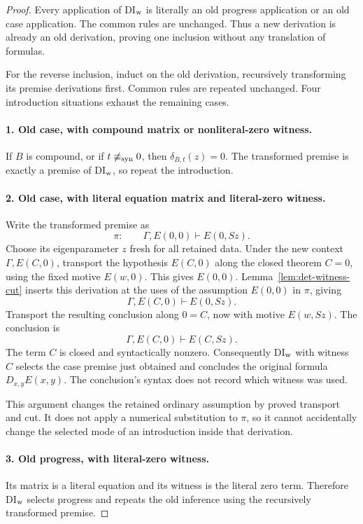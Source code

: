 \begin{proof}
Every application of DI$_{\rm w}$ is literally an old progress
application or an old case application.  The common rules are
unchanged.  Thus a new derivation is already an old derivation, proving
one inclusion without any translation of formulas.

For the reverse inclusion, induct on the old derivation, recursively
transforming its premise derivations first.  Common rules are repeated
unchanged.  Four introduction situations exhaust the remaining cases.

\paragraph{1. Old case, with compound matrix or nonliteral-zero witness.}
If $B$ is compound, or if $t\not\equiv_{\rm syn}0$, then
$\delta_{B,t}(z)=0$.  The transformed premise is exactly a premise of
DI$_{\rm w}$, so repeat the introduction.

\paragraph{2. Old case, with literal equation matrix and literal-zero
witness.}
Write the transformed premise as
\[
 \pi:\qquad\Gamma,E(0,0)\vdash E(0,Sz).
\]
Choose its eigenparameter $z$ fresh for all retained data.  Under the
new context $\Gamma,E(C,0)$, transport the hypothesis $E(C,0)$ along
the closed theorem $C=0$, using the fixed motive $E(w,0)$.  This gives
$E(0,0)$.  Lemma~\ref{lem:det-witness-cut} inserts this derivation
at the uses of the assumption $E(0,0)$ in $\pi$, giving
\[
                 \Gamma,E(C,0)\vdash E(0,Sz).
\]
Transport the resulting conclusion along $0=C$, now with motive
$E(w,Sz)$.  The conclusion is
\[
                 \Gamma,E(C,0)\vdash E(C,Sz).
\]
The term $C$ is closed and syntactically nonzero.  Consequently
DI$_{\rm w}$ with witness $C$ selects the case premise just obtained
and concludes the original formula $D_{x,y}E(x,y)$.  The conclusion's
syntax does not record which witness was used.

This argument changes the retained ordinary assumption by proved
transport and cut.  It does not apply a numerical substitution to
$\pi$, so it cannot accidentally change the selected mode of an
introduction inside that derivation.

\paragraph{3. Old progress, with literal-zero witness.}
Its matrix is a literal equation and its witness is the literal zero
term.  Therefore DI$_{\rm w}$ selects progress and repeats the old
inference using the recursively transformed premise.


\end{proof}

